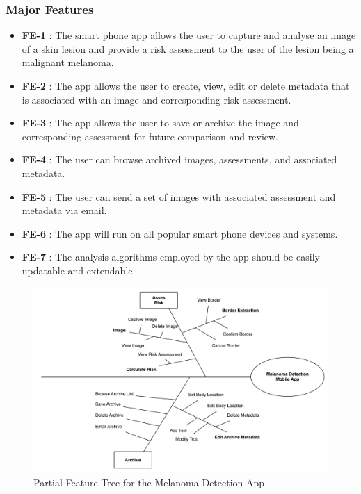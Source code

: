    \subsubsection{Major Features}
        \noindent
        \begin{itemize}[leftmargin=*]
            \item[]  \textbf{FE-1} : The smart phone app allows the user to capture and analyse an image of a skin lesion and provide a risk assessment to the user of the lesion being a malignant melanoma.

            \item[] \textbf{FE-2} : The app allows the user to create, view, edit or delete metadata that is associated with an image and corresponding risk assessment.

            \item[] \textbf{FE-3} : The app allows the user to save or archive the image and corresponding assessment for future comparison and review.

            \item[] \textbf{FE-4} : The user can browse archived images, assessments, and associated metadata.

            \item[] \textbf{FE-5} : The user can send a set of images with associated assessment and metadata via email.

            \item[] \textbf{FE-6} : The app will run on all popular smart phone devices and systems.

            \item[] \textbf{FE-7} : The analysis algorithms employed by the app should be easily updatable and extendable.
        \end{itemize}

        \begin{figure}[H]
            \centering
            \includegraphics[width=\textwidth]{assets/requirements/PartialFeatureTree.pdf}
            \caption{Partial Feature Tree for the Melanoma Detection App}
            \label{fig:partial_feature_tree}
        \end{figure}

